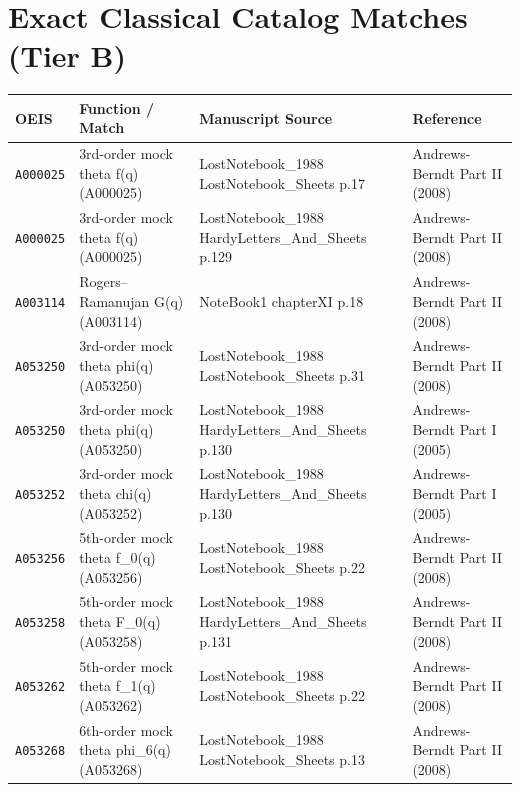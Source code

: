 \documentclass[11pt,twoside,openright]{book}
\begin{document}
\chapter{Exact Classical Catalog Matches (Tier B)}
\begin{longtable}{p{2.0cm}p{4.5cm}p{3.8cm}p{3.5cm}}
\toprule
\textbf{OEIS} & \textbf{Function / Match} & \textbf{Manuscript Source} & \textbf{Reference} \\
\midrule
\endhead
\texttt{A000025} & 3rd-order mock theta f(q) (A000025) & LostNotebook\_1988 LostNotebook\_Sheets p.17 & Andrews-Berndt Part II (2008) \\
\texttt{A000025} & 3rd-order mock theta f(q) (A000025) & LostNotebook\_1988 HardyLetters\_And\_Sheets p.129 & Andrews-Berndt Part II (2008) \\
\texttt{A003114} & Rogers--Ramanujan G(q) (A003114) & NoteBook1 chapterXI p.18 & Andrews-Berndt Part II (2008) \\
\texttt{A053250} & 3rd-order mock theta phi(q) (A053250) & LostNotebook\_1988 LostNotebook\_Sheets p.31 & Andrews-Berndt Part II (2008) \\
\texttt{A053250} & 3rd-order mock theta phi(q) (A053250) & LostNotebook\_1988 HardyLetters\_And\_Sheets p.130 & Andrews-Berndt Part I (2005) \\
\texttt{A053252} & 3rd-order mock theta chi(q) (A053252) & LostNotebook\_1988 HardyLetters\_And\_Sheets p.130 & Andrews-Berndt Part I (2005) \\
\texttt{A053256} & 5th-order mock theta f\_0(q) (A053256) & LostNotebook\_1988 LostNotebook\_Sheets p.22 & Andrews-Berndt Part II (2008) \\
\texttt{A053258} & 5th-order mock theta F\_0(q) (A053258) & LostNotebook\_1988 HardyLetters\_And\_Sheets p.131 & Andrews-Berndt Part II (2008) \\
\texttt{A053262} & 5th-order mock theta f\_1(q) (A053262) & LostNotebook\_1988 LostNotebook\_Sheets p.22 & Andrews-Berndt Part II (2008) \\
\texttt{A053268} & 6th-order mock theta phi\_6(q) (A053268) & LostNotebook\_1988 LostNotebook\_Sheets p.13 & Andrews-Berndt Part II (2008) \\
\bottomrule
\end{longtable}
\end{document}
